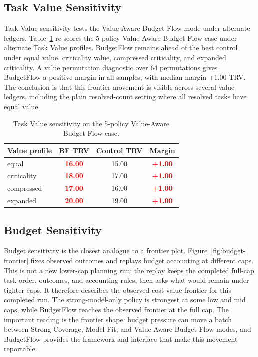 \documentclass[sigconf,review,anonymous]{acmart}
\newcommand{\method}{BudgetFlow\xspace}
\newcommand{\trv}{TRV\xspace}
\newcommand{\pos}[1]{\textcolor{red}{\textbf{#1}}}
\begin{document}
\subsection{Task Value Sensitivity}
Task Value sensitivity tests the Value-Aware Budget Flow mode under alternate ledgers. Table~\ref{tab:value-sensitivity} re-scores the 5-policy Value-Aware Budget Flow case under alternate Task Value profiles. \method remains ahead of the best control under equal value, criticality value, compressed criticality, and expanded criticality. A value permutation diagnostic over 64 permutations gives \method a positive margin in all samples, with median margin +1.00 \trv. The conclusion is that this frontier movement is visible across several value ledgers, including the plain resolved-count setting where all resolved tasks have equal value.

\begin{table}[t]
\centering
\small
\begin{tabular}{lccc}
\toprule
Value profile & BF TRV & Control TRV & Margin \\
\midrule
equal & \pos{16.00} & 15.00 & \pos{+1.00} \\
criticality & \pos{18.00} & 17.00 & \pos{+1.00} \\
compressed & \pos{17.00} & 16.00 & \pos{+1.00} \\
expanded & \pos{20.00} & 19.00 & \pos{+1.00} \\
\bottomrule
\end{tabular}
\caption{Task Value sensitivity on the 5-policy Value-Aware Budget Flow case.}
\label{tab:value-sensitivity}
\end{table}

\subsection{Budget Sensitivity}
Budget sensitivity is the closest analogue to a frontier plot. Figure~\ref{fig:budget-frontier} fixes observed outcomes and replays budget accounting at different caps. This is not a new lower-cap planning run: the replay keeps the completed full-cap task order, outcomes, and accounting rules, then asks what would remain under tighter caps. It therefore describes the observed cost-value frontier for this completed run. The strong-model-only policy is strongest at some low and mid caps, while \method reaches the observed frontier at the full cap. The important reading is the frontier shape: budget pressure can move a batch between Strong Coverage, Model Fit, and Value-Aware Budget Flow modes, and \method provides the framework and interface that make this movement reportable.
\end{document}
